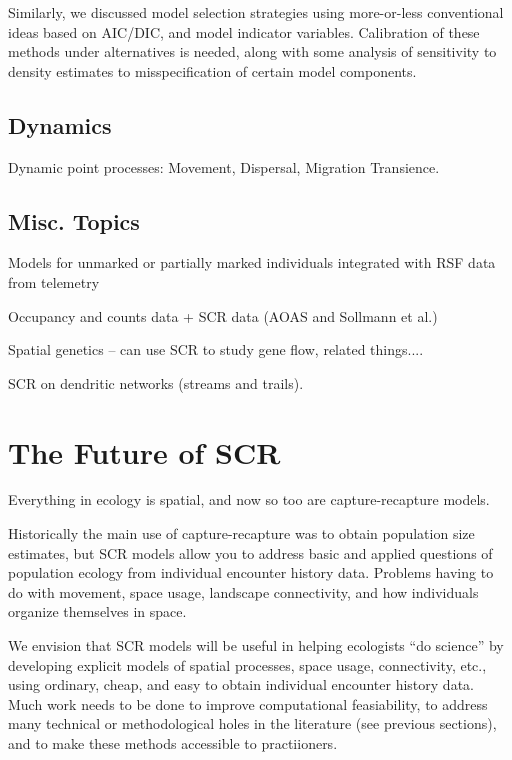 Similarly, we discussed model selection strategies using more-or-less
conventional ideas based on AIC/DIC, and model indicator
variables. Calibration of these methods under alternatives is needed,
along with 
some analysis of sensitivity to density estimates to misspecification
of certain model components.



\subsection{Dynamics}

Dynamic point processes:
Movement, Dispersal, Migration
Transience.


\subsection{Misc. Topics}

Models for unmarked or partially marked individuals integrated with RSF data from telemetry

Occupancy and counts data + SCR data (AOAS and Sollmann et al.)

Spatial genetics  -- can use SCR to study gene flow, related things....

SCR on dendritic networks (streams and trails).





\section{The Future of SCR}

Everything in ecology is spatial, and now so too are capture-recapture
models.

Historically the main use of capture-recapture was to obtain population
size estimates, but
SCR models allow you to address basic and applied questions of
population ecology from individual encounter history data. Problems
having to do with movement, space usage, landscape connectivity, and
how individuals organize themselves in space. 

We envision that SCR models will be useful in helping
ecologists ``do science'' by developing explicit models of spatial
processes, space usage, connectivity, etc., using ordinary, cheap, and
easy to obtain individual encounter history data. Much work needs to
be done to improve computational feasiability, to address many
technical or methodological holes in the literature (see previous
sections), and to make these methods accessible to practiioners.











